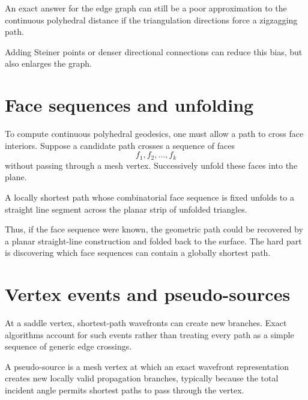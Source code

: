 \begin{warning}\label{warn:vii39-graph}
An exact answer for the edge graph can still be a poor approximation to the
continuous polyhedral distance if the triangulation directions force a
zigzagging path.
\end{warning}

Adding Steiner points or denser directional connections can reduce this bias, but
also enlarges the graph.

\section{Face sequences and unfolding}

To compute continuous polyhedral geodesics, one must allow a path to cross face
interiors.  Suppose a candidate path crosses a sequence of faces
\[
f_1,f_2,\ldots,f_k
\]
without passing through a mesh vertex.  Successively unfold these faces into the
plane.

\begin{theorem}\label{thm:vii39-strip}
A locally shortest path whose combinatorial face sequence is fixed unfolds to a
straight line segment across the planar strip of unfolded triangles.
\end{theorem}

Thus, if the face sequence were known, the geometric path could be recovered by a
planar straight-line construction and folded back to the surface.  The hard part
is discovering which face sequences can contain a globally shortest path.

\section{Vertex events and pseudo-sources}

At a saddle vertex, shortest-path wavefronts can create new branches.  Exact
algorithms account for such events rather than treating every path as a simple
sequence of generic edge crossings.

\begin{definition}\label{def:vii39-pseudosource}
A pseudo-source is a mesh vertex at which an exact wavefront representation
creates new locally valid propagation branches, typically because the total
incident angle permits shortest paths to pass through the vertex.
\end{definition}

